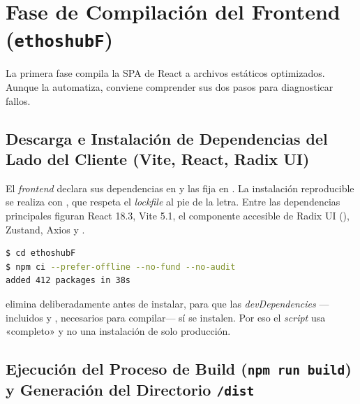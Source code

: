 \section{Fase de Compilación del Frontend (\texttt{ethoshubF})}%
\label{sec:build-frontend}

La primera fase compila la SPA de React a archivos estáticos optimizados. Aunque
 la automatiza, conviene comprender sus dos pasos para diagnosticar
fallos.\par

\subsection[Instalación de Dependencias del Cliente]{Descarga e Instalación de Dependencias del Lado del Cliente (Vite, React, Radix UI)}%
\label{subsec:npm-ci}

El \textit{frontend} declara sus dependencias en  y las fija en
. La instalación reproducible se realiza con ,
que respeta el \textit{lockfile} al pie de la letra. Entre las dependencias principales
figuran React 18.3, Vite 5.1, el componente accesible de Radix UI
(), Zustand, Axios y .\par

\begin{lstlisting}[language=bash]
$ cd ethoshubF
$ npm ci --prefer-offline --no-fund --no-audit
added 412 packages in 38s
\end{lstlisting}

\begin{NotaConfiguracion}
 elimina deliberadamente  antes de instalar,
para que las \textit{devDependencies} —incluidos  y ,
necesarios para compilar— sí se instalen. Por eso el \textit{script} usa 
«completo» y no una instalación de solo producción.
\end{NotaConfiguracion}

\subsection[Build del Frontend y Generación de /dist]{Ejecución del Proceso de Build (\texttt{npm run build}) y Generación del Directorio \texttt{/dist}}%
\label{subsec:npm-build}

